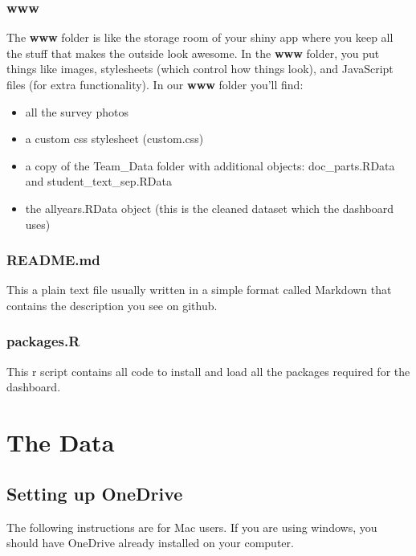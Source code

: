 \documentclass[
]{book}
\theoremstyle{definition}
\theoremstyle{definition}
\theoremstyle{definition}
\theoremstyle{definition}
\theoremstyle{remark}
\begin{document}
\hypertarget{www}{%
\subsection{www}\label{www}}

The \textbf{www} folder is like the storage room of your shiny app where you keep all the stuff that makes the outside look awesome. In the \textbf{www} folder, you put things like images, stylesheets (which control how things look), and JavaScript files (for extra functionality). In our \textbf{www} folder you'll find:

\begin{itemize}
\item
  all the survey photos
\item
  a custom css stylesheet (custom.css)
\item
  a copy of the Team\_Data folder with additional objects: doc\_parts.RData and student\_text\_sep.RData
\item
  the allyears.RData object (this is the cleaned dataset which the dashboard uses)
\end{itemize}

\hypertarget{readme.md}{%
\subsection{README.md}\label{readme.md}}

This a plain text file usually written in a simple format called Markdown that contains the description you see on github.

\hypertarget{packages.r}{%
\subsection{packages.R}\label{packages.r}}

This r script contains all code to install and load all the packages required for the dashboard.

\hypertarget{the-data}{%
\chapter{The Data}\label{the-data}}

\hypertarget{setting-up-onedrive}{%
\section{Setting up OneDrive}\label{setting-up-onedrive}}

The following instructions are for Mac users. If you are using windows, you should have OneDrive already installed on your computer.
\end{document}
